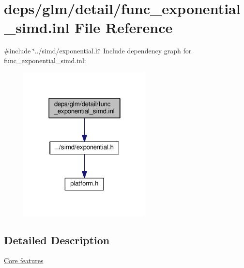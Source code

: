 \hypertarget{func__exponential__simd_8inl}{}\section{deps/glm/detail/func\+\_\+exponential\+\_\+simd.inl File Reference}
\label{func__exponential__simd_8inl}
{\ttfamily \#include \char`\"{}../simd/exponential.\+h\char`\"{}}\newline
Include dependency graph for func\+\_\+exponential\+\_\+simd.\+inl\+:
\nopagebreak
\begin{figure}[H]
\begin{center}
\leavevmode
\includegraphics[width=190pt]{d3/dc1/func__exponential__simd_8inl__incl}
\end{center}
\end{figure}


\subsection{Detailed Description}
\hyperlink{group__core}{Core features} 